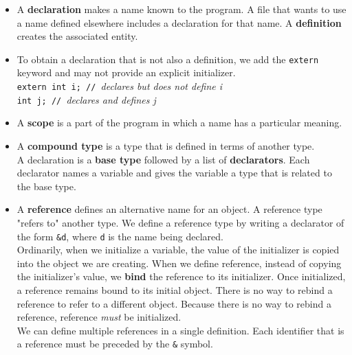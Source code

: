 \begin{itemize}
\item A \textbf{declaration} makes a name known to the program. A file that wants to use a name defined elsewhere includes a declaration for that name. A \textbf{definition} creates the associated entity.

\item To obtain a declaration that is not also a definition, we add the \texttt{extern} keyword and may not provide an explicit initializer.\\\hspace*{1em}\texttt{extern int i; // }\textit{declares but does not define i}\\\hspace*{1em}\texttt{int j; // }\textit{declares and defines j}

\item A \textbf{scope} is a part of the program in which a name has a particular meaning.

\item A \textbf{compound type} is a type that is defined in terms of another type.\\A declaration is a \textbf{base type} followed by a list of \textbf{declarators}. Each declarator names a variable and gives the variable a type that is related to the base type.

\item A \textbf{reference} defines an alternative name for an object. A reference type "refers to" another type. We define a reference type by writing a declarator of the form \texttt{\&d}, where \texttt{d} is the name being declared.\\Ordinarily, when we initialize a variable, the value of the initializer is copied into the object we are creating. When we define reference, instead of copying the initializer's value, we \textbf{bind} the reference to its initializer. Once initialized, a reference remains bound to its initial object. There is no way to rebind a reference to refer to a different object. Because there is no way to rebind a reference, reference \textit{must} be initialized.\\We can define multiple references in a single definition. Each identifier that is a reference must be preceded by the \texttt{\&} symbol.


\end{itemize}

